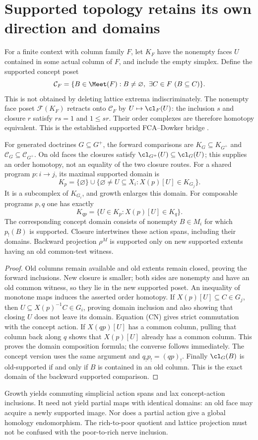 \section{Supported topology retains its own direction and domains}
\label{sec:supported}
For a finite context with column family $F$, let $K_F$ have the nonempty
faces $U$ contained in some actual column of $F$, and include the empty
simplex. Define the supported concept poset
\[
 \mathcal C_F=\{B\in\Meet(F): B\ne\varnothing,
                         \ \exists C\in F\ (B\subseteq C)\}.
\]
This is not obtained by deleting lattice extrema indiscriminately. The
nonempty face poset $\mathcal F(K_F)$ retracts onto $\mathcal C_F$ by
$U\mapsto\cl_F(U)$: the inclusion $s$ and closure $r$ satisfy
$rs=1$ and $1\leq sr$. Their order complexes are therefore homotopy
equivalent. This is the established supported FCA--Dowker bridge
\cite{Common,GP,BS}.

\begin{proposition}
For generated doctrines $G\subseteq G^+$, the forward comparisons are
$K_G\subseteq K_{G^+}$ and $\mathcal C_G\subseteq\mathcal C_{G^+}$.
On old faces the closures satisfy $\cl_{G^+}(U)\subseteq\cl_G(U)$;
this supplies an order homotopy, not an equality of the two closure routes.
For a shared program $p:i\to j$, its maximal supported domain is
\[
 K_p=\{\varnothing\}\cup
 \{\varnothing\ne U\subseteq X_i:X(p)[U]\in K_{G_j}\}.
\]
It is a subcomplex of $K_{G_i}$, and growth enlarges this domain.
For composable programs $p,q$ one has exactly
\[
 K_{qp}=\{U\in K_p:X(p)[U]\in K_q\}.
\]
The corresponding concept domain consists of nonempty $B\in M_i$ for
which $p_!(B)$ is supported. Closure intertwines these action spans,
including their domains. Backward projection $\rho^M$ is supported
only on new supported extents having an old common-test witness.
\end{proposition}
\begin{proof}
Old columns remain available and old extents remain closed, proving the
forward inclusions. New closure is smaller; both sides are nonempty and
have an old common witness, so they lie in the new supported poset.
An inequality of monotone maps induces the asserted order homotopy.
If $X(p)[U]\subseteq C\in G_j$, then
$U\subseteq X(p)^{-1}C\in G_i$, proving domain inclusion and also
showing that closing $U$ does not leave its domain. Equation (CN) gives
strict commutation with the concept action. If $X(qp)[U]$ has a
common column, pulling that column back along $q$ shows that $X(p)[U]$
already has a common column. This proves the domain composition formula;
the converse follows immediately. The concept version uses the same
argument and $q_!p_!=(qp)_!$. Finally $\cl_G(B)$ is old-supported
if and only if $B$ is contained in an old column. This is the exact
domain of the backward supported comparison.
\end{proof}
Growth yields commuting simplicial action spans and lax concept-action
inclusions. It need not yield partial maps with identical domains: an old
face may acquire a newly supported image. Nor does a partial action give
a global homology endomorphism. The rich-to-poor quotient and lattice
projection must not be confused with the poor-to-rich nerve inclusion.

